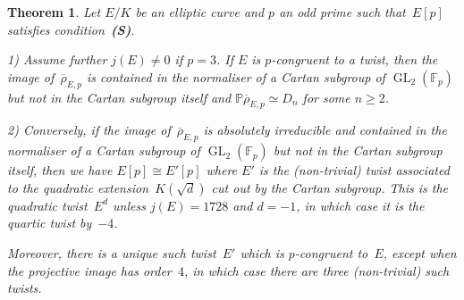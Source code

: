 \documentclass[twoside,leqno,symbols-for-thanks, draft]{rmi}
\numberwithin{equation}{section}
\newcommand{\condS}{condition~{\bf (S)}}
\newcommand{\Fp}{\mathbb{F}_p}
\newcommand{\PP}{\mathbb{P}}
\newcommand{\rhobar}{{\overline{\rho}}}
\newcommand{\GL}{\operatorname{GL}}
\newtheorem{theorem}{Theorem}[section]
\theoremstyle{remark}
\begin{document}
\begin{theorem}\label{T:twist}
Let $E/K$ be an elliptic curve and $p$ an odd prime such that~$E[p]$
satisfies \condS. 

1) Assume further $j(E) \neq 0$ if $p=3$. If $E$ is $p$-congruent to a twist, 
then the image of~$\rhobar_{E,p}$ is contained in the normaliser of a
Cartan subgroup of $\GL_2(\Fp)$ but not in the Cartan subgroup itself and
$\PP \rhobar_{E,p} \simeq D_n$ for some $n \geq 2$.

2) Conversely, if the image of~$\rhobar_{E,p}$ is absolutely irreducible and contained in the
normaliser of a Cartan subgroup of $\GL_2(\Fp)$ but not in the Cartan
subgroup itself, 
then we have $E[p]\cong E'[p]$ where $E'$ is the (non-trivial) twist associated to
the quadratic extension~$K(\sqrt{d})$ cut out by the Cartan subgroup.
This is the quadratic twist~$E^d$ unless $j(E)=1728$ and $d=-1$, in
which case it is the quartic twist by~$-4$.

Moreover, there is a unique such twist~$E'$ which is $p$-congruent to~$E$, except when the
projective image has order~$4$, in which case there are three (non-trivial) such
twists.
\end{theorem}
\end{document}
